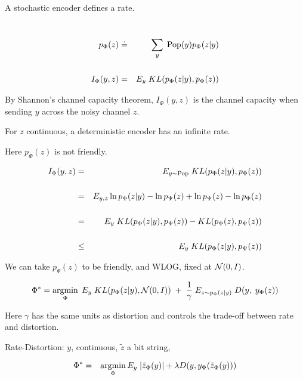 {

A stochastic encoder defines a rate.

\vfill
{\
\begin{eqnarray*}
p_\Phi(z) & \doteq & \sum_y\; \mathrm{Pop}(y)p_\Phi(z|y) \\
\\
I_\Phi(y,z) & = &  E_y \;KL(p_\Phi(z|y),p_\Phi(z))
\end{eqnarray*}


\vfill
By Shannon's channel capacity theorem, $I_\Phi(y,z)$ is the channel capacity when sending $y$ across the noisy channel $z$.

\vfill
For $z$ continuous, a deterministic encoder has an infinite rate.

\vfill
{\color{red}  Here $p_\Phi(z)$ is not friendly.}


\begin{eqnarray*}
I_\Phi(y,z) & = & E_{y \sim \mathrm{Pop}}\; KL(p_\Phi(z|y),p_\Phi(z)) \\
\\
& = & E_{y,z} \ln p_\Phi(z|y) - \ln p_\Psi(z) + \ln p_\Psi(z) - \ln p_\Phi(z) \\
\\
& = & E_y\;KL(p_\Phi(z|y),p_\Psi(z)) - KL(p_\Phi(z),p_\Psi(z)) \\
\\
& \leq & E_y\;KL(p_\Phi(z|y),p_\Psi(z))
\end{eqnarray*}

\vfill
{\color{red} We can take $p_\Psi(z)$ to be friendly, and WLOG, fixed at ${\cal N}(0,I)$.}


{\color{red} {\Huge $$\Phi^* = \operatorname*{argmin}_{\Phi}\;E_y \;KL(p_\Phi(z|y),{\cal N}(0,I)) \;+\; \frac{1}{\gamma} \; E_{z\sim p_\Phi(z|y)}\;D(y,\;y_\Phi(z))$$}}

\vfill
Here $\gamma$ has the same units as distortion and controls the trade-off between rate and distortion.



Rate-Distortion: $y$, continuous, $\tilde{z}$ a bit string,

{\color{red}
\begin{eqnarray*}
\Phi^* &  = &  \operatorname*{argmin}_\Phi E_y \;|\tilde{z}_\Phi(y)| + \lambda D(y,y_\Phi(\tilde{z}_\Phi(y)))
\end{eqnarray*}
}

}}
